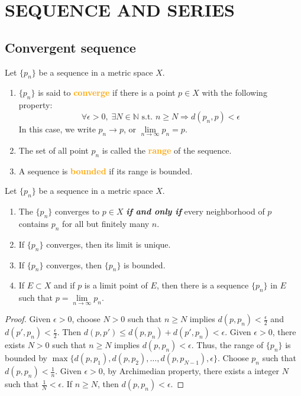 \section{SEQUENCE AND SERIES}

\subsection{Convergent sequence}

\begin{definition}
Let $\{p_n\}$ be a sequence in a metric space $X$.
\begin{enumerate}[label={(\arabic*)}]
\item $\{p_n\}$ is said to \textbf{\textcolor{orange}{converge}} if there is a point $p\in X$ with the following property:
$$ \forall \epsilon>0,\; \exists N\in \mathbb{N}\text{ s.t. }n\geq N\Rightarrow d(p_n,p)<\epsilon$$
In this case, we write $p_n\to p$, or $\lim\limits_{n\to \infty}p_n=p$.
\item The set of all point $p_n$ is called the \textbf{\textcolor{orange}{range}} of the sequence.
\item A sequence is \textbf{\textcolor{orange}{bounded}} if its range is bounded.
\end{enumerate}
\end{definition}

\begin{theorem}
Let $\{p_n\}$ be a sequence in a metric space $X$.
\begin{enumerate}[label={(\alph*)}]
\item The $\{p_n\}$ converges to $p\in X$ \textbf{\emph{if and only if}} every neighborhood of $p$ contains $p_n$ for all but finitely many $n$.
\item If $\{p_n\}$ converges, then its limit is unique.
\item If $\{p_n\}$ converges, then $\{p_n\}$ is bounded.
\item If $E\subset X$ and if $p$ is a limit point of $E$, then there is a sequence $\{p_n\}$ in $E$ such that $p=\lim\limits_{n\to\infty}p_n$.
\end{enumerate}
\end{theorem}
\begin{proof}
 Given $\epsilon>0$, choose $N>0$ such that $n\geq N$ implies $d(p,p_n)<\frac{\epsilon}{2}$ and $d(p',p_n)<\frac{\epsilon}{2}$. Then $d(p,p')\leq d(p,p_n)+d(p',p_n)<\epsilon$.
 Given $\epsilon>0$, there exists $N>0$ such that $n\geq N$ implies $d(p,p_n)<\epsilon$. Thus, the range of $\{p_n\}$ is bounded by $\max\{d(p,p_1),d(p,p_2),\dots,d(p,p_{N-1}),\epsilon\}$.
 Choose $p_n$ such that $d(p,p_n)<\frac{1}{n}$. Given $\epsilon>0$, by Archimedian property, there exists a integer $N$ such that $\frac{1}{N}<\epsilon$. If $n\geq N$, then $d(p,p_n)<\epsilon$.
\end{proof}

